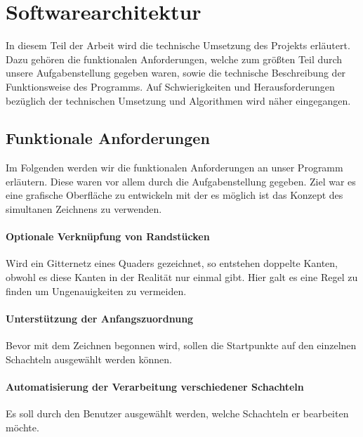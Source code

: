 \section{Softwarearchitektur}
\label{sec:backend}

In diesem Teil der Arbeit wird die technische Umsetzung des Projekts erläutert. Dazu gehören die funktionalen Anforderungen, welche zum größten Teil durch unsere Aufgabenstellung gegeben waren, sowie die technische Beschreibung der Funktionsweise des Programms. Auf Schwierigkeiten und Herausforderungen bezüglich der technischen Umsetzung und Algorithmen wird näher eingegangen.\\


\subsection{Funktionale Anforderungen}
\label{subsec:anforderungen}

Im Folgenden werden wir die funktionalen Anforderungen an unser Programm erläutern. Diese waren vor allem durch die Aufgabenstellung gegeben. Ziel war es eine grafische Oberfläche zu entwickeln mit der es möglich ist das Konzept des simultanen Zeichnens zu verwenden.

\paragraph{Optionale Verknüpfung von Randstücken}
Wird ein Gitternetz eines Quaders gezeichnet, so entstehen doppelte Kanten, obwohl es diese Kanten in der Realität nur einmal gibt. Hier galt es eine Regel zu finden um Ungenauigkeiten zu vermeiden.

\paragraph{Unterstützung der Anfangszuordnung}
Bevor mit dem Zeichnen begonnen wird, sollen die Startpunkte auf den einzelnen Schachteln ausgewählt werden können.

\paragraph{Automatisierung der Verarbeitung verschiedener Schachteln}
Es soll durch den Benutzer ausgewählt werden, welche Schachteln er bearbeiten möchte.

